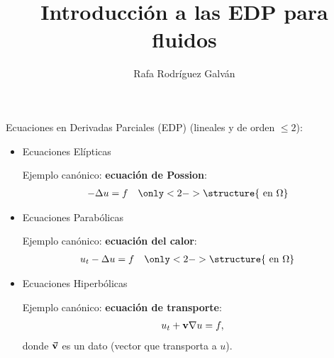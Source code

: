 \documentclass[9pt, dvipsnames]{beamer}
\title{Introducción a las EDP para fluidos}
\author{Rafa Rodríguez Galván}
\begin{document}

\begin{frame}
\maketitle
\end{frame}


\begin{frame}{Ecuaciones en Derivadas Parciales (EDP)}
   (lineales y de orden $\le 2$):
  \begin{itemize}
  \item Ecuaciones \alert{Elípticas}
      \par\quad Ejemplo canónico: \textbf{ecuación de Possion}:
      \begin{align*}
        -\Delta u &= f \quad \only<2->{\structure{\text{ en  } \Omega}}
      \end{align*}
  \item Ecuaciones \alert{Parabólicas}
      \par\quad Ejemplo canónico: \textbf{ecuación del calor}:
      \begin{align*}
        u_t - \Delta u &= f \quad \only<2->{\structure{\text{ en  } \Omega}}
      \end{align*}
  \item Ecuaciones  \alert{Hiperbólicas}
    \par\quad Ejemplo canónico: \textbf{ecuación de transporte}:
      \begin{align*}
        u_t + \mathbf{v} \nabla u = f,
      \end{align*}
      \quad donde $\vec{\mathbf{v}}$ es un dato (vector que transporta a $u$).
  \end{itemize}
  \medskip
\end{frame}
\end{document}
